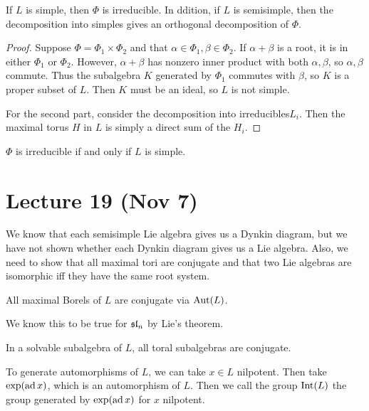 \documentclass[twoside, 10pt]{article}
\begin{document}
    \begin{prop} If $L$ is simple, then $\Phi$ is irreducible. In ddition, if
    $L$ is semisimple, then the decomposition into simples gives an orthogonal
decomposition of $\Phi$.  \end{prop}

    \begin{proof} Suppose $\Phi = \Phi_1 \times \Phi_2$ and that $\alpha \in
        \Phi_1, \beta \in \Phi_2$. If $\alpha + \beta$ is a root, it is in
        either $\Phi_1$ or $\Phi_2$. However, $\alpha + \beta$ has nonzero
        inner product with both $\alpha, \beta$, so $\alpha,\beta$ commute.
        Thus the subalgebra $K$ generated by $\Phi_1$ commutes with $\beta$, so
        $K$ is a proper subset of $L$. Then $K$ must be an ideal, so $L$ is not
        simple.

        For the second part, consider the decomposition into irreducibles$L_i$.
    Then the maximal torus $H$ in $L$ is simply a direct sum of the $H_i$.
\end{proof}

    \begin{cor} $\Phi$ is irreducible if and only if $L$ is simple.  \end{cor}

    \section{Lecture 19 (Nov 7)}%
    
    We know that each semisimple Lie algebra gives us a Dynkin diagram, but we
    have not shown whether each Dynkin diagram gives us a Lie algebra. Also, we
    need to show that all maximal tori are conjugate and that two Lie algebras
    are isomorphic iff they have the same root system.

    \begin{lem} All maximal Borels of $L$ are conjugate via $\operatorname{Aut}(L)$.
    \end{lem}

    We know this to be true for $\mathfrak{sl}_n$ by Lie's theorem.

    \begin{lem} In a solvable subalgebra of $L$, all toral subalgebras are
    conjugate.  \end{lem}

    To generate automorphisms of $L$, we can take $x \in L$ nilpotent. Then
    take $\exp(\operatorname{ad} x)$, which is an automorphism of $L$. Then we call the group
    $\mathrm{Int}(L)$ the group generated by $\exp(\operatorname{ad} x)$ for $x$ nilpotent.
\end{document}
